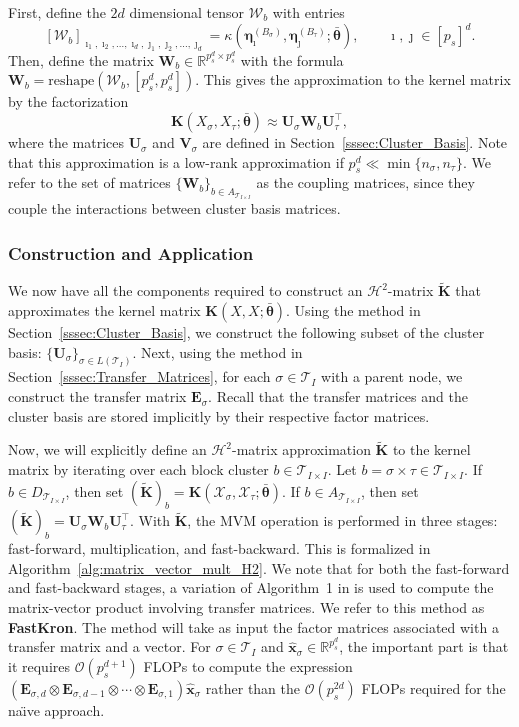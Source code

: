 \documentclass[final,3p,times]{elsarticle}
\newcommand{\mc}[1]{\mathcal{#1}}
\renewcommand{\vec}[1]{\boldsymbol{#1}}
\newcommand{\vech}[1]{\widehat{\boldsymbol{#1}}}
\newcommand{\mat}[1]{\boldsymbol{#1}}
\newcommand{\R}{\mathbb{R}}
\newcommand{\ten}[1]{\boldsymbol{\mathcal{#1}}}
\newcommand{\mathat}[1]{\widetilde{\boldsymbol{#1}}}
\begin{document}
First, define the $2d$ dimensional tensor $\ten{W}_{b}$  with entries
$$[\ten{W}_{b}]_{\imath_1, \imath_2, \dots, \imath_d, \jmath_1, \jmath_2, \dots, \jmath_d} = \kappa(\vec{\eta}_{\vec{\imath}}^{(B_{\sigma})}, \vec{\eta}_{\vec{\jmath}}^{(B_{\tau})}; \bar{\vec{\theta}}), \qquad \vec{\imath}, \vec{\jmath} \in [p_s]^d.$$
Then, define the matrix $\mat{W}_{b} \in \R^{p_{s}^{d} \times p_{s}^{d}}$ with the  formula
$ \mat{W}_{b} = \text{reshape}(\ten{W}_{b}, [p_s^d, p_s^d]).$ This gives the approximation to the kernel matrix by the factorization $$ \mat{K}({X}_{\sigma}, {X}_{\tau}; \bar{\vec{\theta}}) \approx \mat{U}_{\sigma}\mat{W}_{b}\mat{U}_{\tau}^{\top},$$ where the matrices $\mat{U}_\sigma$ and $\mat{V}_\sigma$ are defined in Section~\ref{sssec:Cluster_Basis}. Note that this approximation is a low-rank approximation if $p_{s}^d \ll \min\{n_{\sigma}, n_{\tau}\}$. We refer to the set of  matrices  $\{\mat{W}_{b} \}_{b \in A_{\mc{T}_{I \times I}}}$ as the coupling matrices, since they couple the interactions between cluster basis matrices. 


\subsubsection{Construction and Application}\label{sssec:H2_MVM}
 We now have all the components required to construct an $\mc{H}^{2}$-matrix $\mathat{K}$ that approximates the kernel matrix $\mat{K}({X}, {X}; \bar{\vec{\theta}})$. Using the method in Section~\ref{sssec:Cluster_Basis}, we construct the following subset of the cluster basis: $\{\mat{U}_{\sigma}\}_{\sigma \in L(\mc{T}_{I})}$. Next, using the method in Section~\ref{sssec:Transfer_Matrices}, for each $\sigma \in \mc{T}_{I}$ with a parent node, we construct the transfer matrix $\mat{E}_{\sigma}$. Recall that the transfer matrices and the cluster basis are stored implicitly by their respective factor matrices. 
 
 Now, we will explicitly define an $\mc{H}^2$-matrix approximation $\mathat{K}$ to the kernel matrix by iterating over each block cluster $b \in \mc{T}_{I \times I}$. Let $b  =\sigma \times \tau \in \mc{T}_{I \times I}$. If $b \in D_{\mc{T}_{I \times I}}$, then set 
$(\mathat{K})_b = \mat{K}(\mc{X}_{\sigma}, \mc{X}_{\tau}; \bar{\vec{\theta}}).$ If $b \in A_{\mc{T}_{I \times I}}$, then set $(\mathat{K})_b = \mat{U}_{\sigma} \mat{W}_{b}\mat{U}_{\tau}^{\top}.$
With $\mathat{K}$, the MVM operation is performed in three stages: fast-forward, multiplication, and fast-backward. This is formalized in Algorithm~\ref{alg:matrix_vector_mult_H2}. We  note that for both the fast-forward and fast-backward stages, a variation of Algorithm~1 in \cite{fackler2019algorithm} is used to compute the matrix-vector product involving transfer matrices. We refer to this method as \textbf{FastKron}. The method will take as input the factor matrices associated with a transfer matrix and a vector. For $\sigma \in \mc{T}_{I}$ and $\vech{x}_{\sigma} \in \R^{p_s^{d}}$, the important part is that it requires $\mc{O}(p_s^{d+1})$ FLOPs to compute the expression $(\mat{E}_{\sigma, d} \otimes \mat{E}_{\sigma, d-1} \otimes \cdots \otimes \mat{E}_{\sigma, 1})\vech{x}_{\sigma}$ rather than the $\mc{O}(p_s^{2d})$ FLOPs required for the na\"{\i}ve approach.
\end{document}
